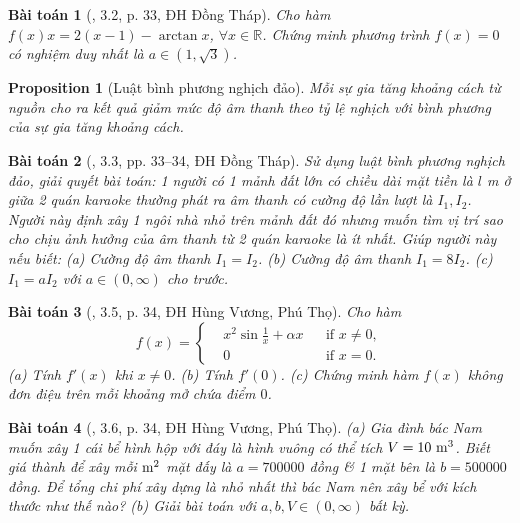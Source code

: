 \documentclass[oneside]{book}
\newtheorem{baitoan}{Bài toán}
\newtheorem{proposition}{Proposition}
\begin{document}
\begin{baitoan}[\cite{VMS_VMC2023}, 3.2, p. 33, ĐH Đồng Tháp]
	Cho hàm $f(x)x = 2(x - 1) - \arctan x$, $\forall x\in\mathbb{R}$. Chứng minh phương trình $f(x) = 0$ có nghiệm duy nhất là $a\in(1,\sqrt{3})$.
\end{baitoan}

\begin{proposition}[Luật bình phương nghịch đảo]
	Mỗi sự gia tăng khoảng cách từ nguồn cho ra kết quả giảm mức độ âm thanh theo tỷ lệ nghịch với bình phương của sự gia tăng khoảng cách.
\end{proposition}

\begin{baitoan}[\cite{VMS_VMC2023}, 3.3, pp. 33--34, ĐH Đồng Tháp]
	Sử dụng luật bình phương nghịch đảo, giải quyết bài toán: 1 người có 1 mảnh đất lớn có chiều dài mặt tiền là $l$ {\rm m} ở giữa 2 quán karaoke thường phát ra âm thanh có cường độ lần lượt là $I_1,I_2$. Người này định xây 1 ngôi nhà nhỏ trên mảnh đất đó nhưng muốn tìm vị trí sao cho chịu ảnh hưởng của âm thanh từ 2 quán karaoke là ít nhất. Giúp người này nếu biết: (a) Cường độ âm thanh $I_1 = I_2$. (b) Cường độ âm thanh $I_1 = 8I_2$. (c) $I_1 = aI_2$ với $a\in(0,\infty)$ cho trước.
\end{baitoan}

\begin{baitoan}[\cite{VMS_VMC2023}, 3.5, p. 34, ĐH Hùng Vương, Phú Thọ]
	Cho hàm
	\begin{equation*}
		f(x) = \left\{\begin{split}
			&x^2\sin\frac{1}{x} + \alpha x&&\mbox{if } x\ne0,\\
			&0&&\mbox{if } x = 0.
		\end{split}\right.
	\end{equation*}
	(a) Tính $f'(x)$ khi $x\ne0$. (b) Tính $f'(0)$. (c) Chứng minh hàm $f(x)$ không đơn điệu trên mỗi khoảng mở chứa điểm $0$.
\end{baitoan}

\begin{baitoan}[\cite{VMS_VMC2023}, 3.6, p. 34, ĐH Hùng Vương, Phú Thọ]
	(a) Gia đình bác Nam muốn xây 1 cái bể hình hộp với đáy là hình vuông có thể tích $V = 10\ {\rm m}^3$. Biết giá thành để xây mỗi $\rm m^2$ mặt đấy là $a = 700000$ đồng \& 1 mặt bên là $b = 500000$ đồng. Để tổng chi phí xây dựng là nhỏ nhất thì bác Nam nên xây bể với kích thước như thế nào? (b) Giải bài toán với $a,b,V\in(0,\infty)$ bất kỳ.
\end{baitoan}
\end{document}
